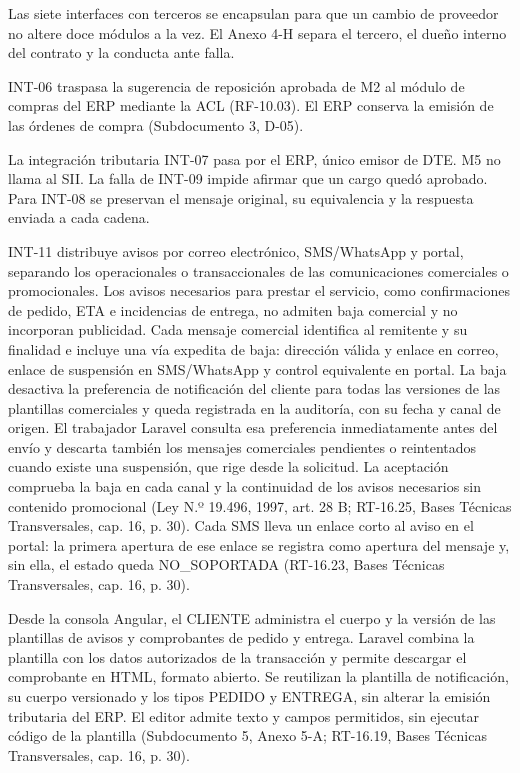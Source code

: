 Las siete interfaces con terceros se encapsulan para que un cambio de proveedor no altere doce módulos a la vez. El Anexo 4-H separa el tercero, el dueño interno del contrato y la conducta ante falla.

INT-06 traspasa la sugerencia de reposición aprobada de M2 al módulo de compras del ERP mediante la ACL (RF-10.03). El ERP conserva la emisión de las órdenes de compra (Subdocumento 3, D-05).


La integración tributaria INT-07 pasa por el ERP, único emisor de DTE. M5 no llama al SII. La falla de INT-09 impide afirmar que un cargo quedó aprobado. Para INT-08 se preservan el mensaje original, su equivalencia y la respuesta enviada a cada cadena.

INT-11 distribuye avisos por correo electrónico, SMS/WhatsApp y portal, separando los operacionales o transaccionales de las comunicaciones comerciales o promocionales. Los avisos necesarios para prestar el servicio, como confirmaciones de pedido, ETA e incidencias de entrega, no admiten baja comercial y no incorporan publicidad. Cada mensaje comercial identifica al remitente y su finalidad e incluye una vía expedita de baja: dirección válida y enlace en correo, enlace de suspensión en SMS/WhatsApp y control equivalente en portal. La baja desactiva la preferencia de notificación del cliente para todas las versiones de las plantillas comerciales y queda registrada en la auditoría, con su fecha y canal de origen. El trabajador Laravel consulta esa preferencia inmediatamente antes del envío y descarta también los mensajes comerciales pendientes o reintentados cuando existe una suspensión, que rige desde la solicitud. La aceptación comprueba la baja en cada canal y la continuidad de los avisos necesarios sin contenido promocional (Ley N.º 19.496, 1997, art. 28 B; RT-16.25, Bases Técnicas Transversales, cap. 16, p. 30). Cada SMS lleva un enlace corto al aviso en el portal: la primera apertura de ese enlace se registra como apertura del mensaje y, sin ella, el estado queda NO\_SOPORTADA (RT-16.23, Bases Técnicas Transversales, cap. 16, p. 30).

Desde la consola Angular, el CLIENTE administra el cuerpo y la versión de las plantillas de avisos y comprobantes de pedido y entrega. Laravel combina la plantilla con los datos autorizados de la transacción y permite descargar el comprobante en HTML, formato abierto. Se reutilizan la plantilla de notificación, su cuerpo versionado y los tipos PEDIDO y ENTREGA, sin alterar la emisión tributaria del ERP. El editor admite texto y campos permitidos, sin ejecutar código de la plantilla (Subdocumento 5, Anexo 5-A; RT-16.19, Bases Técnicas Transversales, cap. 16, p. 30).

